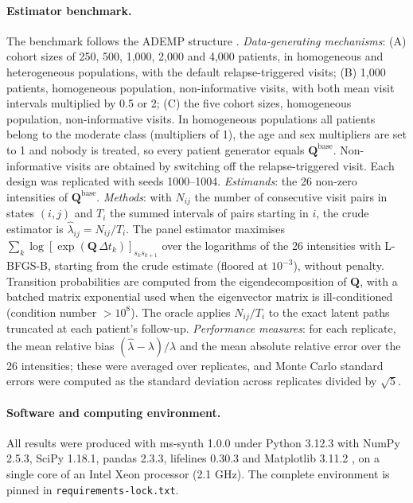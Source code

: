 \documentclass[11pt,a4paper]{article}
\newcommand{\Q}{\mathbf{Q}}
\newcommand{\soft}[1]{\texttt{#1}}
\begin{document}
\paragraph{Estimator benchmark.}
The benchmark follows the ADEMP structure \cite{morris2019}. \emph{Data-generating mechanisms}: (A) cohort sizes of 250, 500, 1,000, 2,000 and 4,000 patients, in homogeneous and heterogeneous populations, with the default relapse-triggered visits; (B) 1,000 patients, homogeneous population, non-informative visits, with both mean visit intervals multiplied by 0.5 or 2; (C) the five cohort sizes, homogeneous population, non-informative visits. In homogeneous populations all patients belong to the moderate class (multipliers of 1), the age and sex multipliers are set to 1 and nobody is treated, so every patient generator equals $\Q^{\mathrm{base}}$. Non-informative visits are obtained by switching off the relapse-triggered visit. Each design was replicated with seeds 1000--1004. \emph{Estimands}: the 26 non-zero intensities of $\Q^{\mathrm{base}}$. \emph{Methods}: with $N_{ij}$ the number of consecutive visit pairs in states $(i,j)$ and $T_i$ the summed intervals of pairs starting in $i$, the crude estimator is $\hat\lambda_{ij}=N_{ij}/T_i$. The panel estimator maximises $\sum_k \log[\exp(\Q\,\Delta t_k)]_{s_k s_{k+1}}$ over the logarithms of the 26 intensities with L-BFGS-B, starting from the crude estimate (floored at $10^{-3}$), without penalty. Transition probabilities are computed from the eigendecomposition of $\Q$, with a batched matrix exponential used when the eigenvector matrix is ill-conditioned (condition number $>10^{8}$). The oracle applies $N_{ij}/T_i$ to the exact latent paths truncated at each patient's follow-up. \emph{Performance measures}: for each replicate, the mean relative bias $(\hat\lambda-\lambda)/\lambda$ and the mean absolute relative error over the 26 intensities; these were averaged over replicates, and Monte Carlo standard errors were computed as the standard deviation across replicates divided by $\sqrt{5}$.

\paragraph{Software and computing environment.}
All results were produced with ms-synth 1.0.0 under Python 3.12.3 with NumPy 2.5.3, SciPy 1.18.1, pandas 2.3.3, lifelines 0.30.3 and Matplotlib 3.11.2 \cite{harris2020,virtanen2020,mckinney2010,davidsonpilon2019,hunter2007}, on a single core of an Intel Xeon processor (2.1 GHz). The complete environment is pinned in \soft{requirements-lock.txt}.
\end{document}
